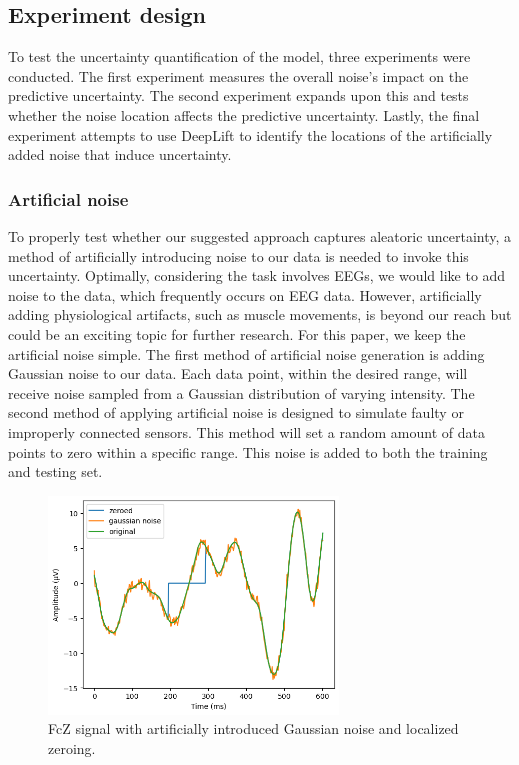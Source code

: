 \subsection{Experiment design}

To test the uncertainty quantification of the model, three experiments were conducted. The first experiment measures the overall noise's impact on the predictive uncertainty. The second experiment expands upon this and tests whether the noise location affects the predictive uncertainty. Lastly, the final experiment attempts to use DeepLift to identify the locations of the artificially added noise that induce uncertainty.

\subsubsection{Artificial noise}

To properly test whether our suggested approach captures aleatoric uncertainty, a method of artificially introducing noise to our data is needed to invoke this uncertainty. Optimally, considering the task involves EEGs, we would like to add noise to the data, which frequently occurs on EEG data. However, artificially adding physiological artifacts, such as muscle movements, is beyond our reach but could be an exciting topic for further research. For this paper, we keep the artificial noise simple. The first method of artificial noise generation is adding Gaussian noise to our data. Each data point, within the desired range, will receive noise sampled from a Gaussian distribution of varying intensity. The second method of applying artificial noise is designed to simulate faulty or improperly connected sensors. This method will set a random amount of data points to zero within a specific range. This noise is added to both the training and testing set.

\begin{figure}[!tbp]
    \centering
        \includegraphics[width=7.7cm]{img/noise.png}
    \caption{FcZ signal with artificially introduced Gaussian noise and localized zeroing.}
    \label{fig:noise}
\end{figure}

